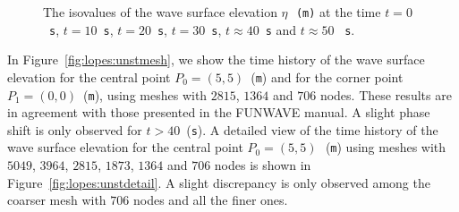 \begin{figure}
{\caption{The  isovalues of the wave surface elevation
$\eta$\,~{\tt (m)}  at the time $t=0$~{\tt s},
$t=10$~{\tt s}, $t=20$~{\tt s},
 $t=30$~{\tt s}, $t\approx40$~{\tt s} and
$t\approx50$ ~{\tt s}. }\par}
\label{fig:lopes:symmetry}
\end{figure}

In Figure~\ref{fig:lopes:unstmesh}, we show the time history of
the wave surface elevation for the central point
$P_0=(5,5)$~({\tt m}) and for the corner point
$P_1=(0,0)$~({\tt m}), using meshes with $2815$, $1364$ and
$706$ nodes.
These results are in agreement with those presented in the
FUNWAVE manual. A slight phase shift is only  observed  for
$t>40$~({\tt s}).
A detailed view of the time history of the
wave surface elevation for the central point
$P_0=(5,5)$\,~({\tt m}) using meshes with $5049$, $3964$,
$2815$, $1873$, $1364$ and $706$ nodes is shown in
Figure~\ref{fig:lopes:unstdetail}. A slight discrepancy
is only observed  among the coarser mesh with
$706$ nodes  and all the finer ones.

